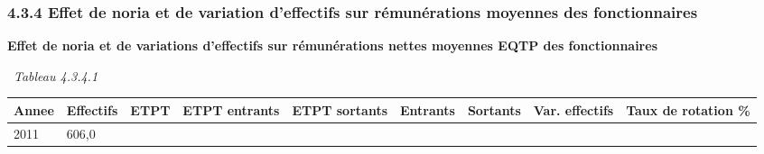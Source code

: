 \hypertarget{effet-de-noria-et-de-variation-deffectifs-sur-remunerations-moyennes-des-fonctionnaires}{%
\subsubsection{4.3.4 Effet de noria et de variation d'effectifs sur
rémunérations moyennes des
fonctionnaires}\label{effet-de-noria-et-de-variation-deffectifs-sur-remunerations-moyennes-des-fonctionnaires}}

\textbf{Effet de noria et de variations d'effectifs sur rémunérations
nettes moyennes EQTP des fonctionnaires}

~\emph{Tableau 4.3.4.1}

\begin{longtable}[]{@{}lllllllll@{}}
\toprule
\begin{minipage}[b]{0.05\columnwidth}\raggedright
Annee\strut
\end{minipage} & \begin{minipage}[b]{0.08\columnwidth}\raggedright
Effectifs\strut
\end{minipage} & \begin{minipage}[b]{0.05\columnwidth}\raggedright
ETPT\strut
\end{minipage} & \begin{minipage}[b]{0.10\columnwidth}\raggedright
ETPT entrants\strut
\end{minipage} & \begin{minipage}[b]{0.10\columnwidth}\raggedright
ETPT sortants\strut
\end{minipage} & \begin{minipage}[b]{0.07\columnwidth}\raggedright
Entrants\strut
\end{minipage} & \begin{minipage}[b]{0.07\columnwidth}\raggedright
Sortants\strut
\end{minipage} & \begin{minipage}[b]{0.11\columnwidth}\raggedright
Var. effectifs\strut
\end{minipage} & \begin{minipage}[b]{0.14\columnwidth}\raggedright
Taux de rotation \%\strut
\end{minipage}\tabularnewline
\midrule
\endhead
\begin{minipage}[t]{0.05\columnwidth}\raggedright
2011\strut
\end{minipage} & \begin{minipage}[t]{0.08\columnwidth}\raggedright
606,0\strut
\end{minipage} & \begin{minipage}[t]{0.05\columnwidth}\raggedright

\end{minipage}
\end{longtable}
